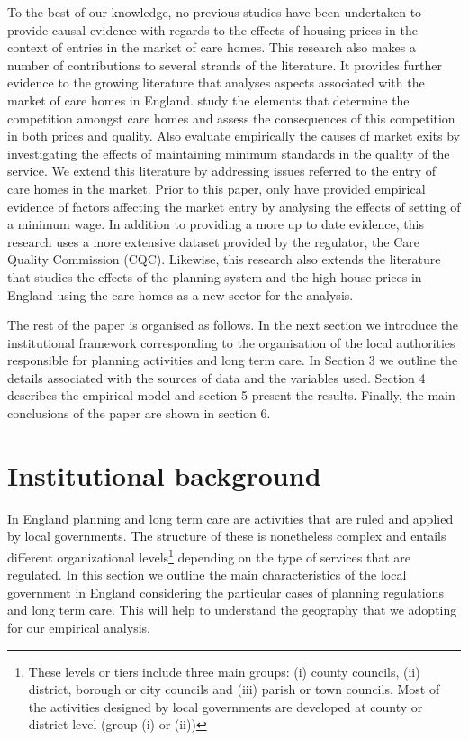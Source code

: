 \documentclass[12pt,letterpaper]{article}
\begin{document}
To the best of our knowledge, no previous studies have been undertaken to provide causal evidence with
 regards to the effects of housing prices in the context of entries in the market of care homes. This research
  also makes a number of contributions to several strands of the literature. It provides further evidence to the 
  growing literature that analyses aspects associated with the market of care homes in England. \citet{forder2014} study the elements that determine the competition amongst care homes and assess the 
  consequences of this competition in both prices and quality. Also \citet{allan2015} evaluate empirically 
  the causes of market exits by investigating the effects of maintaining minimum standards in the quality of 
  the service. We extend this literature by addressing issues referred to the entry of care homes in the market. 
  Prior to this paper, only \cite{machin2003} have provided empirical evidence of factors affecting the market
   entry by analysing the effects of setting of a minimum wage. In addition to providing a more up to date
    evidence, this research uses a more extensive dataset provided by the regulator, the
     Care Quality Commission (CQC). Likewise, this research also extends the literature that studies the effects 
     of the planning system and the high house prices in England using the care homes as a new sector
      for the analysis. 

The rest of the paper is organised as follows. In the next section we introduce
 the institutional framework corresponding to the organisation of the local authorities
  responsible for planning activities and long term care. In Section 3 we outline the details
   associated with the sources of data and the variables used. Section 4 describes the empirical
    model and section 5 present the results. Finally, the main conclusions of the paper are shown in section 6. 

\section{Institutional background}
\label{sec: background}

In England planning and long term care are activities that are ruled and applied by local governments. 
The structure of these is nonetheless complex and entails different organizational levels\footnote{These levels or tiers include three main groups: (i) county councils, (ii) district, borough or city councils and (iii) parish or 
town councils. Most of the activities designed by local governments are developed at county or district level 
(group (i) or (ii))} depending on the type of services that are regulated. 
In this section we outline the main characteristics of the local government in England 
considering the particular cases of planning regulations and long term care. 
This will help to understand the geography that we adopting for our empirical analysis. 
\end{document}
